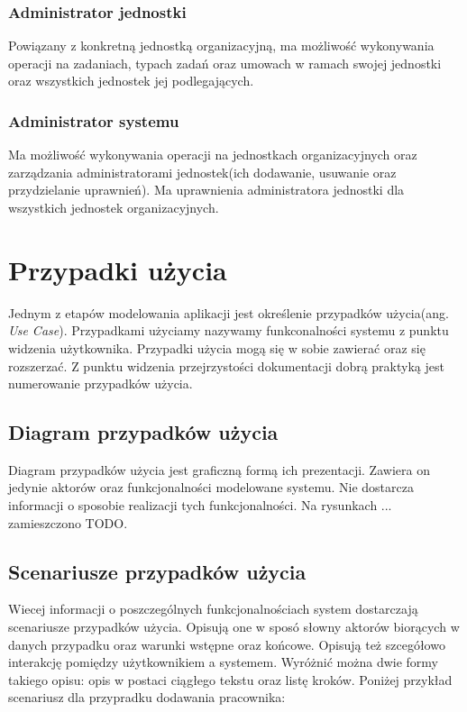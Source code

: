 \subsubsection{Administrator jednostki}
Powiązany z konkretną jednostką organizacyjną, ma możliwość wykonywania operacji na zadaniach, typach zadań oraz umowach w ramach swojej jednostki oraz wszystkich jednostek jej podlegających.

\subsubsection{Administrator systemu}
Ma możliwość wykonywania operacji na jednostkach organizacyjnych oraz zarządzania administratorami jednostek(ich dodawanie, usuwanie oraz przydzielanie uprawnień). Ma uprawnienia administratora jednostki dla wszystkich jednostek organizacyjnych.

\section[Przypadki użycia][Przypadki użycia]{Przypadki użycia}
Jednym z etapów modelowania aplikacji jest określenie przypadków użycia(ang. \textit{Use Case}). Przypadkami użyciamy nazywamy funkconalności systemu z punktu widzenia użytkownika. Przypadki użycia mogą się w sobie zawierać oraz się rozszerzać. Z punktu widzenia przejrzystości dokumentacji dobrą praktyką jest numerowanie przypadków użycia.

\subsection[Diagram przypadków użycia][Diagram przypadków użycia]{Diagram przypadków użycia}
Diagram przypadków użycia jest graficzną formą ich prezentacji. Zawiera on jedynie aktorów oraz funkcjonalności modelowane systemu. Nie dostarcza informacji o sposobie realizacji tych funkcjonalności. Na rysunkach ... zamieszczono TODO.

\subsection[Scenariusze przypadków użycia][Scenariusze przypadków użycia]{Scenariusze przypadków użycia}
Wiecej informacji o poszczególnych funkcjonalnościach system dostarczają scenariusze przypadków użycia. Opisują one w sposó słowny aktorów biorących w danych przypadku oraz warunki wstępne oraz końcowe. Opisują też szcegółowo interakcję pomiędzy użytkownikiem a systemem. Wyróżnić można dwie formy takiego opisu: opis w postaci ciągłego tekstu oraz listę kroków. Poniżej przykład scenariusz dla przypradku dodawania pracownika:

